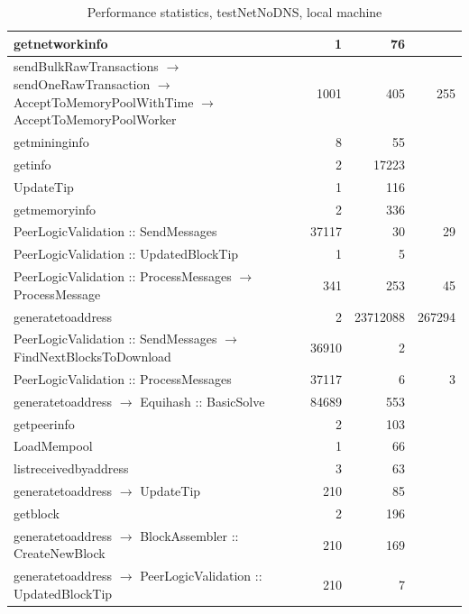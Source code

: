 \documentclass{article}
\begin{document}
\begin{table}
\begin{longtable}{P{8cm}|r|r|r}
		getnetworkinfo& 1& 76&\\\hline
		sendBulkRawTransactions $\to$ sendOneRawTransaction $\to$ AcceptToMemoryPoolWithTime $\to$ AcceptToMemoryPoolWorker& 1001& 405&255\\\hline
		getmininginfo& 8& 55&\\\hline
		getinfo& 2& 17223&\\\hline
		UpdateTip& 1& 116&\\\hline
		getmemoryinfo& 2& 336&\\\hline
		PeerLogicValidation :: SendMessages& 37117& 30&29\\\hline
		PeerLogicValidation :: UpdatedBlockTip& 1& 5&\\\hline
		PeerLogicValidation :: ProcessMessages $\to$ ProcessMessage& 341& 253&45\\\hline
		generatetoaddress& 2& 23712088&267294\\\hline
		PeerLogicValidation :: SendMessages $\to$ FindNextBlocksToDownload& 36910& 2&\\\hline
		PeerLogicValidation :: ProcessMessages& 37117& 6&3\\\hline
		generatetoaddress $\to$ Equihash :: BasicSolve& 84689& 553&\\\hline
		getpeerinfo& 2& 103&\\\hline
		LoadMempool& 1& 66&\\\hline
		listreceivedbyaddress& 3& 63&\\\hline
		generatetoaddress $\to$ UpdateTip& 210& 85&\\\hline
		getblock& 2& 196&\\\hline
		generatetoaddress $\to$ BlockAssembler :: CreateNewBlock& 210& 169&\\\hline
		generatetoaddress $\to$ PeerLogicValidation :: UpdatedBlockTip& 210& 7&\\\hline
	\end{longtable}

\caption{\label{tablePerformanceLocalTestNetNoDNS} Performance statistics, testNetNoDNS, local machine}
\end{table} 
\end{document}
